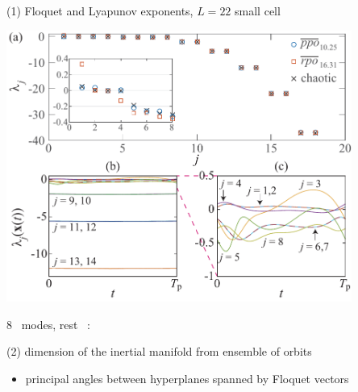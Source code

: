 \begin{frame}{(1) Floquet and Lyapunov exponents, $L=22$ small cell}
\begin{center}
\includegraphics[width=0.85\textwidth]{../../dimension/ks22FloqExp}
\end{center}
8 \entangled\ modes, rest \transient\  :

\hfill \color{red}{inertial manifold is 8 dimensional!}
\end{frame}

\begin{frame}{(2) dimension of the inertial manifold from ensemble of orbits}

\bigskip

\begin{itemize}
  \item principal angles between hyperplanes spanned by Floquet vectors
\end{itemize}
\end{frame}

